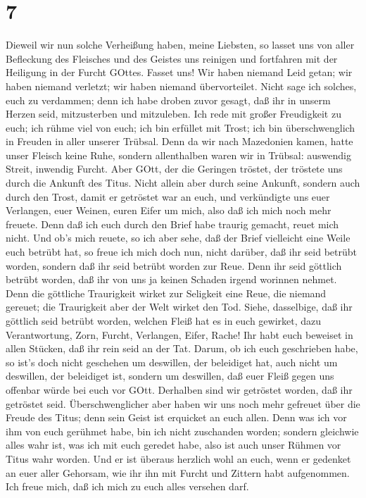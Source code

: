 \hypertarget{section-6}{%
\section{7}\label{section-6}}

 Dieweil wir nun solche Verheißung haben, meine Liebsten, so
lasset uns von aller Befleckung des Fleisches und des Geistes uns
reinigen und fortfahren mit der Heiligung in der Furcht GOttes.
 Fasset uns! Wir haben niemand Leid getan; wir haben niemand
verletzt; wir haben niemand übervorteilet.  Nicht sage ich
solches, euch zu verdammen; denn ich habe droben zuvor gesagt, daß ihr
in unserm Herzen seid, mitzusterben und mitzuleben.  Ich
rede mit großer Freudigkeit zu euch; ich rühme viel von euch; ich bin
erfüllet mit Trost; ich bin überschwenglich in Freuden in aller unserer
Trübsal.  Denn da wir nach Mazedonien kamen, hatte unser
Fleisch keine Ruhe, sondern allenthalben waren wir in Trübsal: auswendig
Streit, inwendig Furcht.  Aber GOtt, der die Geringen
tröstet, der tröstete uns durch die Ankunft des Titus. 
Nicht allein aber durch seine Ankunft, sondern auch durch den Trost,
damit er getröstet war an euch, und verkündigte uns euer Verlangen, euer
Weinen, euren Eifer um mich, also daß ich mich noch mehr freuete.
 Denn daß ich euch durch den Brief habe traurig gemacht,
reuet mich nicht. Und ob's mich reuete, so ich aber sehe, daß der Brief
vielleicht eine Weile euch betrübt hat,  so freue ich mich
doch nun, nicht darüber, daß ihr seid betrübt worden, sondern daß ihr
seid betrübt worden zur Reue. Denn ihr seid göttlich betrübt worden, daß
ihr von uns ja keinen Schaden irgend worinnen nehmet.  Denn
die göttliche Traurigkeit wirket zur Seligkeit eine Reue, die niemand
gereuet; die Traurigkeit aber der Welt wirket den Tod. 
Siehe, dasselbige, daß ihr göttlich seid betrübt worden, welchen Fleiß
hat es in euch gewirket, dazu Verantwortung, Zorn, Furcht, Verlangen,
Eifer, Rache! Ihr habt euch beweiset in allen Stücken, daß ihr rein seid
an der Tat.  Darum, ob ich euch geschrieben habe, so ist's
doch nicht geschehen um deswillen, der beleidiget hat, auch nicht um
deswillen, der beleidiget ist, sondern um deswillen, daß euer Fleiß
gegen uns offenbar würde bei euch vor GOtt.  Derhalben sind
wir getröstet worden, daß ihr getröstet seid. Überschwenglicher aber
haben wir uns noch mehr gefreuet über die Freude des Titus; denn sein
Geist ist erquicket an euch allen.  Denn was ich vor ihm
von euch gerühmet habe, bin ich nicht zuschanden worden; sondern
gleichwie alles wahr ist, was ich mit euch geredet habe, also ist auch
unser Rühmen vor Titus wahr worden.  Und er ist überaus
herzlich wohl an euch, wenn er gedenket an euer aller Gehorsam, wie ihr
ihn mit Furcht und Zittern habt aufgenommen.  Ich freue
mich, daß ich mich zu euch alles versehen darf.

